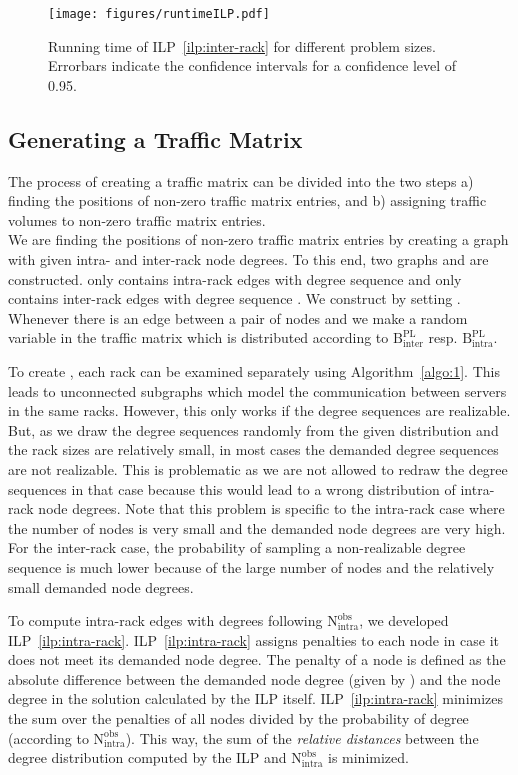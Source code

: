 \documentclass[journal,10pt]{IEEEtran}
\newcommand{\bytes}[2]{\ensuremath{\mathrm{B}^{\mathrm{#1}}_{\mathrm{#2}}}}
\newcommand{\partners}[2]{\ensuremath{\mathrm{N}^{\mathrm{#1}}_{\mathrm{#2}}}}
\begin{document}
\begin{figure}
	\centering
	\texttt{[image: figures/runtimeILP.pdf]}
	\caption{Running time of ILP~\ref{ilp:inter-rack} for different problem sizes. Errorbars indicate the confidence intervals for a confidence level of 0.95.}
	\label{fig:ILPtimes}
\end{figure}
		
		
		
	\subsection{Generating a Traffic Matrix}
	\label{sec:ILPs}
		The process of creating a traffic matrix can be divided into the two steps 
		a) finding the positions of non-zero traffic matrix entries, and
		b) assigning traffic volumes to non-zero traffic matrix entries.\\
		We are finding the positions of non-zero traffic matrix entries by creating a graph  with given intra- and inter-rack node degrees.
		To this end, two graphs  and  are constructed. 
		 only contains intra-rack edges with degree sequence  and
		 only contains inter-rack edges with degree sequence . 
		We construct  by setting .
		Whenever there is an edge between a pair of nodes  and  we make  a random variable in the traffic matrix which is distributed 
		according to  \bytes{PL}{inter} resp. \bytes{PL}{intra}.

		
		To create , each rack can be examined separately using Algorithm~\ref{algo:1}.
		This leads to  unconnected subgraphs which model the communication between servers in the same racks.
		However, this only works if the degree sequences are realizable.
		But, as we draw the degree sequences randomly from the given distribution and the rack sizes are relatively small,
		in most cases the demanded degree sequences are not realizable.
		This is problematic as we are not allowed to redraw the degree sequences in that case because this would
		lead to a wrong distribution of intra-rack node degrees.
		Note that this problem is specific to the intra-rack case where the number of nodes is very small and the demanded node degrees are
		very high. 
		For the inter-rack case,
		the probability of sampling a non-realizable degree sequence is much lower because of the large number of nodes and the relatively
		small demanded node degrees. 
		
		To compute intra-rack edges with degrees following \partners{obs}{intra},
		we developed ILP~\ref{ilp:intra-rack}.
		ILP~\ref{ilp:intra-rack} assigns penalties to each node in case it does not meet its demanded node degree.
		The penalty of a node is defined as the absolute difference between the demanded node degree (given by ) 
		and the node degree in the solution calculated by the ILP itself.
		ILP~\ref{ilp:intra-rack} minimizes the sum over the penalties of all nodes 
		divided by the probability of degree  (according to \partners{obs}{intra}).
		This way, the sum of the \emph{relative distances} between the degree distribution computed by the ILP and
		\partners{obs}{intra} is minimized.
		
\end{document}
